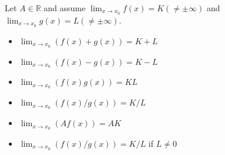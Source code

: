 \begin{theorem}
    Let $A \in \mathbb{R}$ and assume $\lim_{x \to x_0} f(x) = K (\neq \pm \infty)$ and $\lim_{x \to x_0} g(x) = L (\neq \pm \infty)$.
    \begin{itemize}
        \item $\lim_{x \to x_0} (f(x) + g(x)) = K + L$
        \item $\lim_{x \to x_0} (f(x) - g(x)) = K - L$
        \item $\lim_{x \to x_0} (f(x) g(x)) = K L$
        \item $\lim_{x \to x_0} (f(x) / g(x)) = K / L$
        \item $\lim_{x \to x_0} (A f(x)) = A K$
        \item $\lim_{x \to x_0} (f(x)/g(x)) = K/L$ if $L \neq 0$
    \end{itemize}
\end{theorem}

